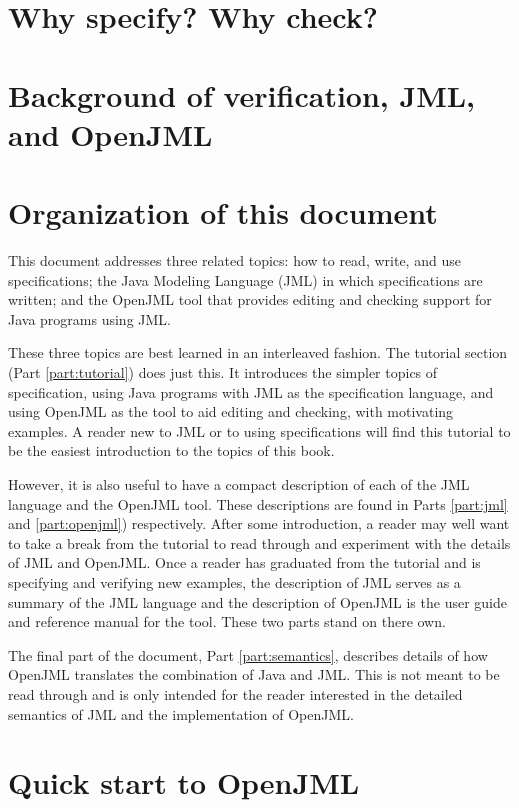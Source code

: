\chapter{Why specify? Why check?}

\chapter{Background of verification, JML, and OpenJML}

\chapter{Organization of this document}

This document addresses three related topics: how to read, write, and use specifications; the Java Modeling Language (JML) in which specifications are written; and the OpenJML tool that provides editing and checking support for Java programs using JML. 

These three topics are best learned in an interleaved fashion. The tutorial section (Part \ref{part:tutorial}) does just this. It introduces the simpler topics of specification, using Java programs with JML as the specification language, and using OpenJML as the tool to aid editing and checking, with motivating examples. A reader new to JML or to using specifications will find this tutorial to be the easiest introduction to the topics of this book. 

However, it is also useful to have a compact description of each of the JML language and the OpenJML tool. These descriptions are found in Parts \ref{part:jml} and \ref{part:openjml}) respectively. After some introduction, a reader may well want to 
take a break from the tutorial to read through and experiment with the details of JML and OpenJML. Once a reader has graduated from the tutorial and is specifying and verifying new examples, the description of JML serves as a summary of the JML language and the description of OpenJML is the user guide and reference manual for the tool. These two parts stand on there own.

The final part of the document, Part \ref{part:semantics}, describes details of how OpenJML translates the combination of Java and JML. This is not meant to be read through and is only intended for the reader interested in the detailed semantics of JML and the implementation of OpenJML.

\chapter{Quick start to OpenJML}

